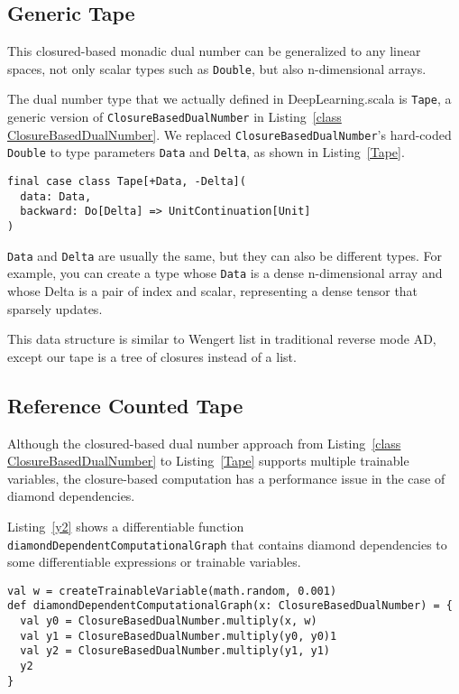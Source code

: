 \subsection{Generic Tape}
\label{generic tape}

This closured-based monadic dual number can be generalized to any linear spaces, not only scalar types such as \lstinline{Double}, but also n-dimensional arrays.

The dual number type that we actually defined in DeepLearning.scala is \lstinline{Tape}, a generic version of \lstinline{ClosureBasedDualNumber} in Listing~\ref{class ClosureBasedDualNumber}. We replaced \lstinline{ClosureBasedDualNumber}'s hard-coded \lstinline{Double} to type parameters \lstinline{Data} and \lstinline{Delta}, as shown in Listing~\ref{Tape}.

\begin{lstlisting}[float={h t b p},caption={Generic closured-based monadic dual number}, label={Tape}]
final case class Tape[+Data, -Delta](
  data: Data,
  backward: Do[Delta] => UnitContinuation[Unit]
)
\end{lstlisting}

\lstinline{Data} and \lstinline{Delta} are usually the same, but they can also be different types. For example, you can create a type whose \lstinline{Data} is a dense n-dimensional array and whose {Delta} is a pair of index and scalar, representing a dense tensor that sparsely updates.

This data structure is similar to Wengert list in traditional reverse mode AD, except our tape is a tree of closures instead of a list.

\subsection{Reference Counted Tape}
\label{reference counted tape}

Although the closured-based dual number approach from Listing~\ref{class ClosureBasedDualNumber} to Listing~\ref{Tape} supports multiple \glspl{trainable variable}, the closure-based computation has a performance issue in the case of diamond dependencies.

Listing~\ref{y2} shows a \gls{differentiable function} \lstinline{diamondDependentComputationalGraph} that contains diamond dependencies to some \glspl{differentiable expression} or \glspl{trainable variable}.

\begin{lstlisting}[float={h t b p},caption={A diamond dependent \gls{differentiable function}}, label={y2}]
val w = createTrainableVariable(math.random, 0.001)
def diamondDependentComputationalGraph(x: ClosureBasedDualNumber) = {
  val y0 = ClosureBasedDualNumber.multiply(x, w)
  val y1 = ClosureBasedDualNumber.multiply(y0, y0)1
  val y2 = ClosureBasedDualNumber.multiply(y1, y1)
  y2
}
\end{lstlisting}

